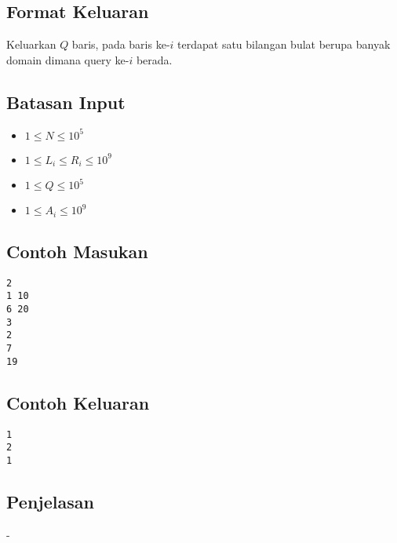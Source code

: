 \documentclass{article}
\begin{document}
\subsection*{Format Keluaran}
Keluarkan $Q$ baris, pada baris ke-$i$ terdapat satu bilangan bulat berupa banyak domain dimana query ke-$i$ berada.

\subsection*{Batasan Input}

\begin{itemize}
    \item{$1 \leq N \leq 10^5$}
    \item{$1 \leq L_i \leq R_i \leq 10^9$}
    \item{$1 \leq Q \leq 10^5$}
    \item{$1 \leq A_i \leq 10^9$}
\end{itemize}

\begin{multicols}{2}
\subsection*{Contoh Masukan}
\begin{lstlisting}
2
1 10
6 20
3
2
7
19
\end{lstlisting}
\columnbreak
\subsection*{Contoh Keluaran}
\begin{lstlisting}
1
2
1
\end{lstlisting}
\vfill
\null
\end{multicols}

\subsection*{Penjelasan}

-
\end{document}
